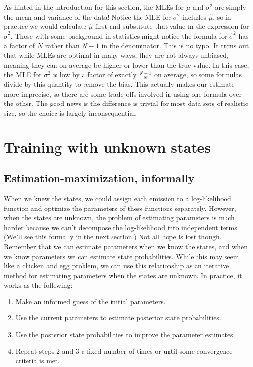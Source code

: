 As hinted in the introduction for this section, the MLEs for $\mu$ and $\sigma^2$ are simply the mean and variance of the data! Notice the MLE for $\sigma^2$ includes $\hat{\mu}$, so in practice we would calculate $\hat{\mu}$ first and substitute that value in the expression for $\hat{\sigma}^2$. Those with some background in statistics might notice the formula for $\hat{\sigma}^2$ has a factor of $N$ rather than $N-1$ in the denominator. This is no typo. It turns out that while MLEs are optimal in many ways, they are not always unbiased, meaning they can on average be higher or lower than the true value. In this case, the MLE for $\sigma^2$ is low by a factor of exactly $\frac{N-1}{N}$ on average, so some formulas divide by this quantity to remove the bias. This actually makes our estimate more imprecise, so there are some trade-offs involved in using one formula over the other. The good news is the difference is trivial for most data sets of realistic size, so the choice is largely inconsequential.

\section{Training with unknown states}

\subsection{Estimation-maximization, informally}

When we knew the states, we could assign each emission to a log-likelihood function and optimize the parameters of these functions separately. However, when the states are unknown, the problem of estimating parameters is much harder because we can't decompose the log-likelihood into independent terms. (We'll see this formally in the next section.) Not all hope is lost though. Remember that we can estimate parameters when we know the states, and when we know parameters we can estimate state probabilities. While this may seem like a chicken and egg problem, we can use this relationship as an iterative method for estimating parameters when the states are unknown. In practice, it works as the following:

\begin{enumerate}
\item Make an informed guess of the initial parameters.
\item Use the current parameters to estimate posterior state probabilities.
\item Use the posterior state probabilities to improve the parameter estimates.
\item Repeat steps 2 and 3 a fixed number of times or until some convergence criteria is met.
\end{enumerate}

